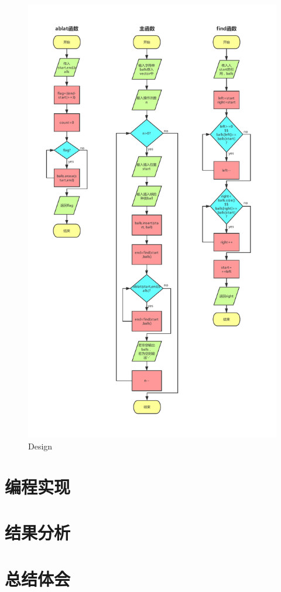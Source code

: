 \documentclass[UTF8]{ctexart}
\begin{document}
\begin{figure}[htbp] 
	\centering 
	\includegraphics[scale=0.7]{zuma.pdf} 
	\caption{Design} 
\end{figure}


	\section{编程实现}
	
	\section{结果分析}
	
	\section{总结体会}
\end{document}
